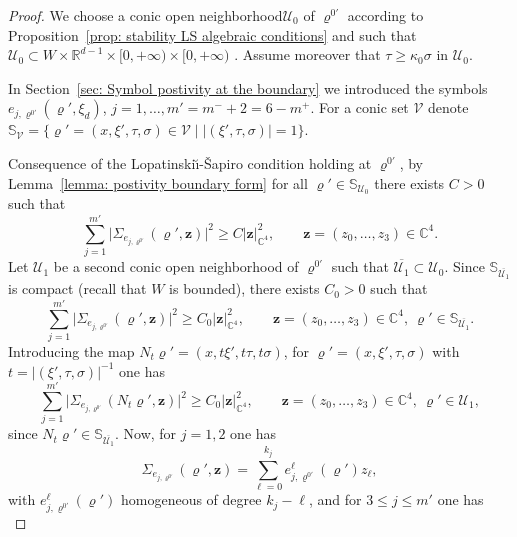 \documentclass[10pt]{amsart}
\let\sep\mid
\theoremstyle{plain}
\theoremstyle{definition}
\def\R{\mathbb{R}}
\def\C{\mathbb{C}}
\newcommand{\LS}{Lopatinski\u{\i}-\v{S}apiro\xspace}
\newcommand{\nhd}{neighborhood\xspace}
\let\k\kappa
\let\y\varrho
\newcommand{\ovl}[1]{\overline{#1}}
\newcommand{\un}[1]{\Sigma_{#1}}
\newcommand{\U}{\mathscr U}
\newcommand{\V}{\mathscr V}
\newcommand{\z}{\boldsymbol{z}}
\begin{document}
\begin{proof}
We choose a conic open \nhd $\U_0$ of $\y^{0\prime}$ according to
Proposition~\ref{prop: stability LS algebraic conditions} and such that $\U_0 \subset W \times \R^{d-1}
\times [0,+\infty) \times [0,+\infty)$ . Assume
moreover that $\tau \geq \k_0 \sigma$ in $\U_0$.

In Section~\ref{sec: Symbol postivity at the boundary} we introduced
the symbols $e_{j, \y^{0\prime}} (\y', \xi_d)$, $j=1, \dots, m' = m^-
+2 = 6 - m^+$.
For a conic set $\V$ denote $\mathbb S_{\V} = \{ \y' = (x,\xi', \tau,\sigma) \in \V\sep |(\xi', \tau,\sigma)|=1\}$.

Consequence of the \LS condition holding at
$\y^{0\prime}$, by
Lemma~\ref{lemma: postivity boundary form} for all $\y' \in \mathbb S_{\U_0}$ there exists $C>0$ such
that\vspace*{-3pt}
\begin{equation*}
\sum_{j=1}^{m'} \big|\un{e_{j, \y^{0\prime}}} (\y', \z)\big|^2 \geq
C |\z|_{\C^{4}}^2,
\qquad \z = (z_0, \dots, z_3) \in \C^{4}.
\end{equation*}
Let $\U_1$ be a second conic open \nhd of $\y^{0\prime}$ such that
$\ovl{\U_1} \subset \U_0$.
Since $\mathbb S_{\ovl{\U_1}}$ is compact (recall that $W$ is bounded), there exists $C_0>0$ such that\vspace*{-4pt}
\begin{equation*}
\sum_{j=1}^{m'} \big|\un{e_{j, \y^{0\prime}}} (\y', \z)\big|^2 \geq
C_0 |\z|_{\C^{4}}^2,
\qquad \z = (z_0, \dots, z_3) \in \C^{4}, \ \y' \in \mathbb S_{\ovl{\U_1}}.
\end{equation*}
Introducing the map $N_{t}\y'=(x, t \xi', t \tau, t \sigma)$, for
$\y'=(x, \xi', \tau, \sigma)$ with $t = |(\xi', \tau,\sigma)|^{-1}$
one has\vspace*{-4pt}
\begin{equation}
\label{eq: symbol positivity 1}
\sum_{j=1}^{m'} \big|\un{e_{j, \y^{0\prime}}} (N_t \y', \z)\big|^2 \geq
C_0 |\z|_{\C^{4}}^2,
\qquad \z = (z_0, \dots, z_3) \in \C^{4}, \ \y' \in \U_1,
\end{equation}
since $N_t \y' \in \mathbb S_{\ovl{\U_1}}$.
Now, for $j=1,2$ one has
\begin{equation*}
\un{e_{j, \y^{0\prime}}} (\y', \z)= \sum_{\ell=0}^{k_j} e_{j,
\y^{0\prime}}^\ell (\y') z_\ell,
\end{equation*}
with $ e_{j, \y^{0\prime}}^\ell (\y')$ homogeneous of degree
$k_j-\ell$,
and for $3\leq j \leq m'$ one has
\begin{equation*}

\end{equation*}
\end{proof}
\end{document}
